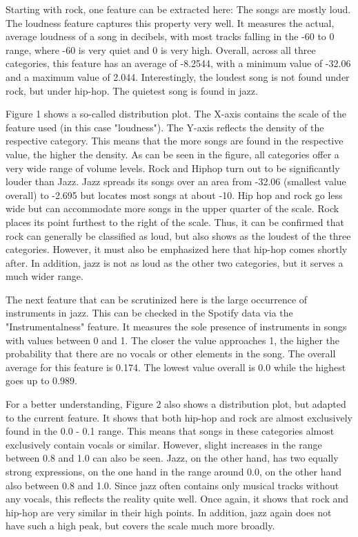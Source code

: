 Starting with rock, one feature can be extracted here: The songs are mostly loud. The loudness feature captures this property very well. It measures the actual, average loudness of a song in decibels, with most tracks falling in the -60 to 0 range, where -60 is very quiet and 0 is very high. Overall, across all three categories, this feature has an average of -8.2544, with a minimum value of -32.06 and a maximum value of 2.044. Interestingly, the loudest song is not found under rock, but under hip-hop. The quietest song is found in jazz. 

Figure 1  shows a so-called distribution plot. The X-axis contains the scale of the feature used (in this case "loudness"). The Y-axis reflects the density of the respective category. This means that the more songs are found in the respective value, the higher the density. As can be seen in the figure, all categories offer a very wide range of volume levels. Rock and Hiphop turn out to be significantly louder than Jazz. Jazz spreads its songs over an area from -32.06 (smallest value overall) to -2.695 but locates most songs at about -10. Hip hop and rock go less wide but can accommodate more songs in the upper quarter of the scale. Rock places its point furthest to the right of the scale. Thus, it can be confirmed that rock can generally be classified as loud, but also shows as the loudest of the three categories. However, it must also be emphasized here that hip-hop comes shortly after. In addition, jazz is not as loud as the other two categories, but it serves a much wider range. 

The next feature that can be scrutinized here is the large occurrence of instruments in jazz. This can be checked in the Spotify data via the "Instrumentalness" feature. It measures the sole presence of instruments in songs with values between 0 and 1. The closer the value approaches 1, the higher the probability that there are no vocals or other elements in the song. The overall average for this feature is 0.174. The lowest value overall is 0.0 while the highest goes up to 0.989.

For a better understanding, Figure 2  also shows a distribution plot, but adapted to the current feature. It shows that both hip-hop and rock are almost exclusively found in the 0.0 - 0.1 range. This means that songs in these categories almost exclusively contain vocals or similar. However, slight increases in the range between 0.8 and 1.0 can also be seen. Jazz, on the other hand, has two equally strong expressions, on the one hand in the range around 0.0, on the other hand also between 0.8 and 1.0. Since jazz often contains only musical tracks without any vocals, this reflects the reality quite well. Once again, it shows that rock and hip-hop are very similar in their high points. In addition, jazz again does not have such a high peak, but covers the scale much more broadly.

